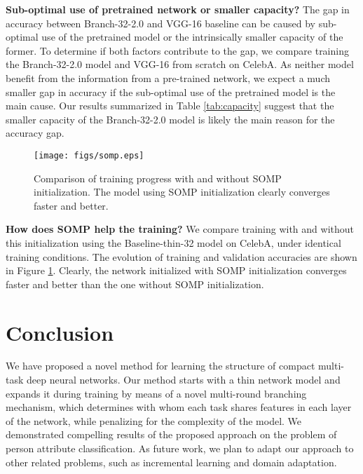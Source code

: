 \documentclass[10pt,twocolumn,letterpaper]{article}
\begin{document}
{\bf Sub-optimal use of pretrained network or smaller capacity?} The gap in accuracy between Branch-32-2.0 and VGG-16 baseline can be caused by sub-optimal use of the pretrained model or the intrinsically smaller capacity of the former. To determine if both factors contribute to the gap, we compare training the Branch-32-2.0 model and VGG-16 from scratch on CelebA. As neither model benefit from the information from a pre-trained network, we expect a much smaller gap in accuracy if the sub-optimal use of the pretrained model is the main cause. Our results summarized in Table \ref{tab:capacity} suggest that the smaller capacity of the Branch-32-2.0 model is likely the main reason for the accuracy gap. 


\begin{figure}[t]
	\begin{center}
		\texttt{[image: figs/somp.eps]}  
	\end{center}
	\caption{Comparison of training progress with and without SOMP initialization. The model using SOMP initialization clearly converges faster and better. }
	\label{fig:somp}
	\vspace{-4mm}
\end{figure}

{\bf How does SOMP help the training?} We compare training with and without this initialization using the Baseline-thin-32 model on CelebA, under identical training conditions. The evolution of training and validation accuracies are shown in Figure \ref{fig:somp}. Clearly, the network initialized with SOMP initialization converges faster and better than the one without SOMP initialization.
\vspace{-1mm}
\section{Conclusion}
\vspace{-1mm}
We have proposed a novel method for learning the structure of compact multi-task deep neural networks. Our method starts with a thin network model and expands it during training by means of a novel multi-round branching mechanism, which determines with whom each task shares features in each layer of the network, while penalizing for the complexity of the model. We demonstrated compelling results of the proposed approach on the problem of person attribute classification. As future work, we plan to adapt our approach to other related problems, such as incremental learning and domain adaptation.

{\small
	
	
}
\end{document}
